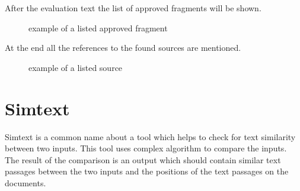 After the evaluation text the list of approved fragments will be shown.

\begin{figure}[!h]
  \centering
  \caption{example of a listed approved fragment}
  \label{fig:report_fragment}
\end{figure}

\pagebreak
At the end all the references to the found sources are mentioned.

\begin{figure}[!h]
  \centering
  \caption{example of a listed source}
  \label{fig:report_according_sources}
\end{figure}

\pagebreak

\section{Simtext}
Simtext is a common name about a tool which helps to check for text similarity between two inputs. This tool uses complex algorithm to compare the inputs. The result of the comparison is an output which should contain similar text passages between the two inputs and the positions of the text passages on the documents. 

